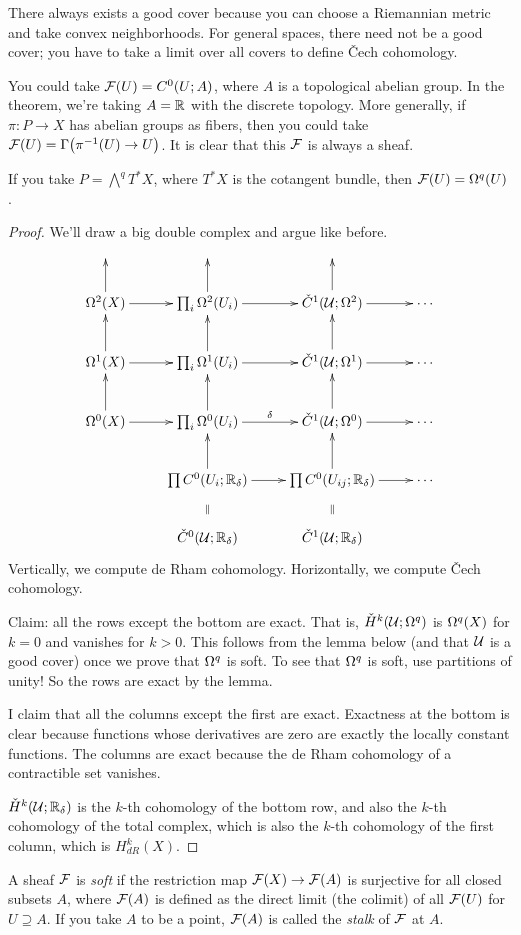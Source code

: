There always exists a good cover because you can choose a Riemannian metric and take convex neighborhoods. For general spaces, there need not be a good cover; you have to take a limit over all covers to define \v Cech cohomology.
\begin{example}
 You could take $\mathcal{F}(U)=C^0(U;A)$, where $A$ is a topological abelian group. In the theorem, we're taking $A=\mathbb{R}$ with the discrete topology. More generally, if $\pi\colon P\to X$ has abelian groups as fibers, then you could take $\mathcal{F}(U)=\Gamma\bigl(\pi^{-1}(U)\to U\bigr)$. It is clear that this $\mathcal{F}$ is always a sheaf.
 
 If you take $P=\bigwedge^q T^*X$, where $T^*X$ is the cotangent bundle, then $\mathcal{F}(U)=\Omega^q(U)$.
\end{example}
\begin{proof}
 We'll draw a big double complex and argue like before.
 \[\xymatrix{
  &  & \\
  \Om^2(X)\ar[u]\ar[r] & \prod_i\Om^2(U_i)\ar[u]\ar[r] & \check C^1(\U;\Om^2) \ar[r]\ar[u] & \cdots \\
  \Om^1(X)\ar[u]\ar[r] & \prod_i\Om^1(U_i)\ar[u]\ar[r] & \check C^1(\U;\Om^1) \ar[r]\ar[u] & \cdots \\
  \Om^0(X)\ar[u]\ar[r] & \prod_i\Om^0(U_i)\ar[u]\ar[r]^\delta & \check C^1(\U;\Om^0) \ar[r]\ar[u] & \cdots\\
  & \prod C^0(U_i;\RR_\delta) \ar[u]\ar[r] & \prod C^0(U_{ij};\RR_\delta) \ar[r]\ar[u] & \cdots\\
  & \check C^0(\U;\RR_\delta)\ar@{}[u]|\parallel & \check C^1(\U;\RR_\delta)\ar@{}[u]|\parallel
 }\]
 Vertically, we compute de Rham cohomology. Horizontally, we compute \v Cech cohomology.
 
 Claim: all the rows except the bottom are exact. That is, $\check H^k(\mathcal{U};\Omega^q)$ is $\Omega^q(X)$ for $k=0$ and vanishes for $k>0$. This follows from the lemma below (and that $\mathcal{U}$ is a good cover) once we prove that $\Omega^q$ is soft. To see that $\Omega^q$ is soft, use partitions of unity! So the rows are exact by the lemma.
 
 I claim that all the columns except the first are exact. Exactness at the bottom is clear because functions whose derivatives are zero are exactly the locally constant functions. The columns are exact because the de Rham cohomology of a contractible set vanishes.
 
 $\check H^k(\mathcal{U};\mathbb{R}_\delta)$ is the $k$-th cohomology of the bottom row, and also the $k$-th cohomology of the total complex, which is also the $k$-th cohomology of the first column, which is $H^k_{dR}(X)$.
\end{proof}
\begin{definition}
 A sheaf $\mathcal{F}$ is \emph{soft} if the restriction map $\mathcal{F}(X)\to \mathcal{F}(A)$ is surjective for all closed subsets $A$, where $\mathcal{F}(A)$ is defined as the direct limit (the colimit) of all $\mathcal{F}(U)$ for $U\supseteq A$. If you take $A$ to be a point, $\mathcal{F}(A)$ is called the \emph{stalk} of $\mathcal{F}$ at $A$.
\end{definition}

